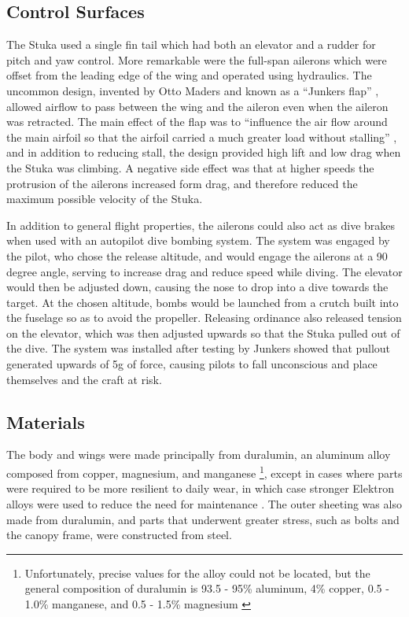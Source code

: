 \documentclass[a4paper, fontsize=11pt]{scrartcl} %
\begin{document}
\subsection{Control Surfaces}
The Stuka used a single fin tail which had both an elevator and a
rudder for pitch and yaw control. More remarkable were the full-span ailerons
which were offset from the leading edge of the wing and operated using hydraulics. The uncommon design,
invented by Otto Maders and known as a ``Junkers flap'' \autocite{}, allowed airflow to pass
between the wing and the aileron even when the aileron was retracted.
The main effect of the flap was to ``influence the air flow around the main airfoil so
that the airfoil carried a much greater load without stalling''
\autocite[p~.14]{wenzinger38}, and in addition to reducing stall, the design
provided high lift and low drag when the Stuka was climbing. A negative
side effect was that at higher speeds the protrusion of the ailerons
increased form drag, and therefore reduced the maximum possible velocity of the Stuka.

In addition to general flight properties, the ailerons could also act as
dive brakes when used with an autopilot dive bombing system. The system was engaged
by the pilot, who chose the release altitude, and would engage the ailerons at a 90 degree angle,
serving to increase drag and reduce speed while diving. The elevator
would then be adjusted down, causing the nose to drop into a dive
towards the target. At the chosen altitude, bombs would be launched from
a crutch built into the fuselage so as to avoid the propeller. Releasing
ordinance also released tension on the elevator, which was then adjusted
upwards so that the Stuka pulled out of the dive.
The system was installed after testing by Junkers showed that pullout
generated upwards of 5g of force, causing pilots to fall unconscious and
place themselves and the craft at risk.

\subsection{Materials}

The body and wings were made principally from
duralumin, an aluminum alloy composed from copper, magnesium, and
manganese
\footnote{Unfortunately, precise values for the alloy could not
  be located, but the general composition of duralumin is 93.5 - 95\% aluminum, 4\%
  copper, 0.5 - 1.0\% manganese, and 0.5 - 1.5\%
  magnesium \autocite[p.~102-103]{wardlaw33}
}, except in cases where parts were required to be more resilient to daily
wear, in which case stronger Elektron alloys were used to reduce the
need for maintenance \autocite[p.~15]{guardia14}. The outer sheeting was
also made from duralumin, and parts that underwent greater stress, such
as bolts and the canopy frame, were constructed from steel.
\end{document}
